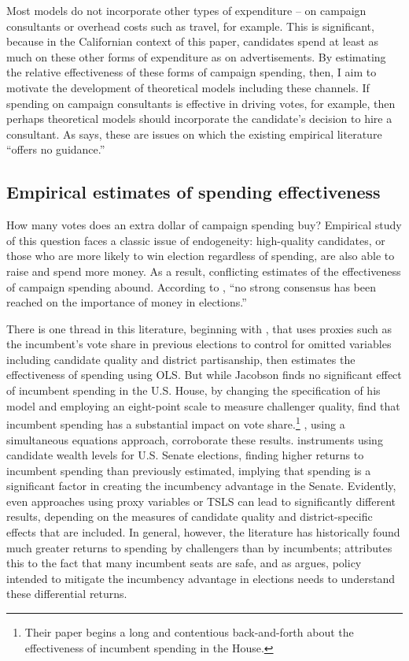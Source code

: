 \documentclass{article}
\begin{document}
Most models do not incorporate other types of expenditure -- on campaign consultants or overhead costs such as travel, for example. This is significant, because in the Californian context of this paper, candidates spend at least as much on these other forms of expenditure as on advertisements. By estimating the relative effectiveness of these forms of campaign spending, then, I aim to motivate the development of  theoretical models including these channels. If spending on campaign consultants is effective in driving votes, for example, then perhaps theoretical models should incorporate the candidate's decision to hire a consultant. As \cite{coate2004pareto} says, these are issues on which the existing empirical literature ``offers no guidance.''

\subsection{Empirical estimates of spending effectiveness}

How many votes does an extra dollar of campaign spending buy? Empirical study of this question faces a classic issue of endogeneity: high-quality candidates, or those who are more likely to win election regardless of spending, are also able to raise and spend more money. As a result, conflicting estimates of the effectiveness of campaign spending abound. According to \cite{milyo-1999}, ``no strong consensus has been reached on the importance of money in elections.'' 

There is one thread in this literature, beginning with \cite{jacobson-1978}, that uses proxies such as the incumbent's vote share in previous elections to control for omitted variables including candidate quality and district partisanship, then estimates the effectiveness of spending using OLS. But while Jacobson finds no significant effect of incumbent spending in the U.S. House, by changing the specification of his model and employing an eight-point scale to measure challenger quality, \cite{green1988salvation} find that incumbent spending has a substantial impact on vote share.\footnote{ Their paper begins a long and contentious back-and-forth about the effectiveness of incumbent spending in the House.} \cite{erikson1998campaign}, using a simultaneous equations approach, corroborate these results. \cite{gerber1998estimating} instruments using candidate wealth levels for U.S. Senate elections, finding higher returns to incumbent spending than previously estimated, implying that spending is a significant factor in creating the incumbency advantage in the Senate. Evidently, even approaches using proxy variables or TSLS can lead to significantly different results, depending on the measures of candidate quality and district-specific effects that are included. In general, however, the literature has historically found much greater returns to spending by challengers than by incumbents; \cite{moon-2006} attributes this to the fact that many incumbent seats are safe, and as \cite{stratmann2005some} argues, policy intended to mitigate the incumbency advantage in elections needs to understand these differential returns.
\end{document}
